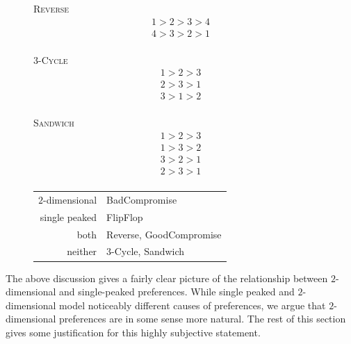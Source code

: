 \documentclass[12pt]{article}
\newcommand{\1}[1]{\mathds{1}[{#1}]}
\begin{document}
  \begin{figure}[H]
    \begin{minipage}{0.15\textwidth}
      \centering
      {\textsc{Reverse}}
      \begin{align*}
        1 > 2 > 3 > 4 \\
        4 > 3 > 2 > 1 \\
      \end{align*}
    \end{minipage}\hfill
    \begin{minipage}{0.15\textwidth}
      \centering
      {$3$-\textsc{Cycle}}
      \begin{align*}
        1 > 2 > 3 \\
        2 > 3 > 1 \\
        3 > 1 > 2 \\
      \end{align*}
    \end{minipage}\hfill
    \begin{minipage}{0.15\textwidth}
      \centering
      {\textsc{Sandwich}}
      \begin{align*}
        1 > 2 > 3 \\
        1 > 3 > 2 \\
        3 > 2 > 1 \\
        2 > 3 > 1 \\
      \end{align*}
    \end{minipage}\hfill
    \begin{minipage}{0.55\textwidth}
      \centering
      \begin{tabular}{ r | l }
        $2$-dimensional & {\sc BadCompromise} \\
        single peaked & {\sc FlipFlop} \\
        both & {\sc Reverse}, {\sc GoodCompromise} \\
        neither & $3$-{\sc Cycle}, {\sc Sandwich} \\
      \end{tabular}
    \end{minipage}\hfill
  \end{figure}

  The above discussion gives a fairly clear picture of the relationship between
  $2$-dimensional and single-peaked preferences.
  While single peaked and $2$-dimensional model noticeably different causes of
  preferences, we argue that $2$-dimensional preferences are in some sense more
  natural. The rest of this section gives some justification
  for this highly subjective statement.
\end{document}
